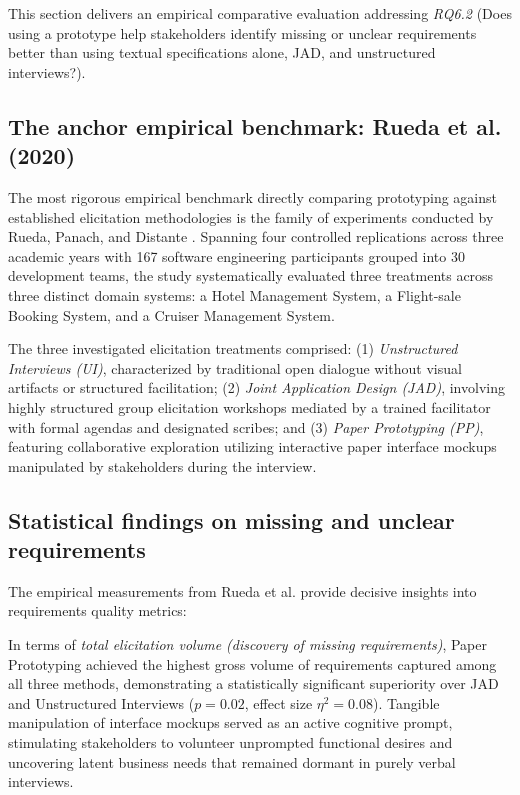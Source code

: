 \documentclass[conference]{IEEEtran}
\begin{document}
This section delivers an empirical comparative evaluation addressing \textit{RQ6.2} (Does using a prototype help stakeholders identify missing or unclear requirements better than using textual specifications alone, JAD, and unstructured interviews?).

\subsection{The anchor empirical benchmark: Rueda et al. (2020)}
The most rigorous empirical benchmark directly comparing prototyping against established elicitation methodologies is the family of experiments conducted by Rueda, Panach, and Distante \cite{rueda2020requirements}. Spanning four controlled replications across three academic years with 167 software engineering participants grouped into 30 development teams, the study systematically evaluated three treatments across three distinct domain systems: a Hotel Management System, a Flight-sale Booking System, and a Cruiser Management System.

The three investigated elicitation treatments comprised: (1) \textit{Unstructured Interviews (UI)}, characterized by traditional open dialogue without visual artifacts or structured facilitation; (2) \textit{Joint Application Design (JAD)}, involving highly structured group elicitation workshops mediated by a trained facilitator with formal agendas and designated scribes; and (3) \textit{Paper Prototyping (PP)}, featuring collaborative exploration utilizing interactive paper interface mockups manipulated by stakeholders during the interview.

\subsection{Statistical findings on missing and unclear requirements}
The empirical measurements from Rueda et al. \cite{rueda2020requirements} provide decisive insights into requirements quality metrics:

In terms of \textit{total elicitation volume (discovery of missing requirements)}, Paper Prototyping achieved the highest gross volume of requirements captured among all three methods, demonstrating a statistically significant superiority over JAD and Unstructured Interviews ($p = 0.02$, effect size $\eta^2 = 0.08$). Tangible manipulation of interface mockups served as an active cognitive prompt, stimulating stakeholders to volunteer unprompted functional desires and uncovering latent business needs that remained dormant in purely verbal interviews.
\end{document}

